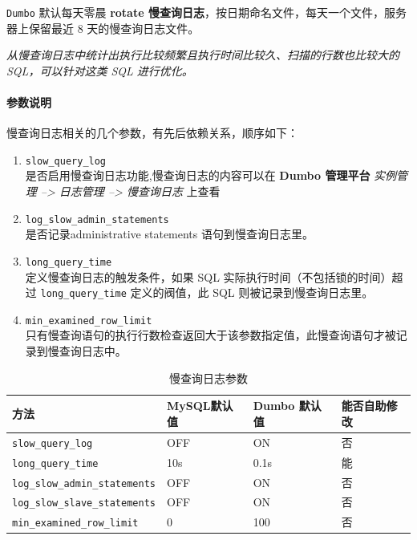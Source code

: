 \documentclass[UTF8,a4paper,12pt]{ctexbook}
\begin{document}
		\verb|Dumbo| 默认每天零晨 \textbf{rotate 慢查询日志}，按日期命名文件，每天一个文件，服务器上保留最近 8 天的慢查询日志文件。
		
		\textit{从慢查询日志中统计出执行比较频繁且执行时间比较久、扫描的行数也比较大的 SQL，可以针对这类 SQL 进行优化。}
	
		\paragraph{参数说明}
			慢查询日志相关的几个参数，有先后依赖关系，顺序如下：
			\begin{enumerate}[itemindent = 2em, itemsep = 0pt,partopsep=0pt]
				\item \verb|slow_query_log| \\ 是否启用慢查询日志功能,慢查询日志的内容可以在 \textbf{Dumbo 管理平台} \textit{实例管理 --> 日志管理 --> 慢查询日志} 上查看
				\item \verb|log_slow_admin_statements| \\ 是否记录administrative statements 语句到慢查询日志里。
				\item \verb|long_query_time| \\ 定义慢查询日志的触发条件，如果 SQL 实际执行时间（不包括锁的时间）超过 \verb|long_query_time| 定义的阀值，此 SQL 则被记录到慢查询日志里。
				\item \verb|min_examined_row_limit| \\ 只有慢查询语句的执行行数检查返回大于该参数指定值，此慢查询语句才被记录到慢查询日志中。
			\end{enumerate}
			
			\begin{table}[H]
				\centering
				\caption{慢查询日志参数}
				\begin{tabular}{p{6cm}<{\centering}|p{3cm}<{\centering}|p{3cm}<{\centering}|p{3cm}<{\centering}}
					\hline
						方法 &  MySQL默认值 &  Dumbo 默认值 & 能否自助修改\\
					\hline
				 \verb|slow_query_log| & OFF & ON &  否 \\
				 \verb|long_query_time| & 10s & 0.1s & 能 \\
				 \verb|log_slow_admin_statements| & OFF & ON & 否 \\
				 \verb|log_slow_slave_statements| & OFF & ON &否\\
				 \verb|min_examined_row_limit| & 0& 100 & 否 \\
					\hline
				\end{tabular}					
			\end{table}
			
\end{document}
